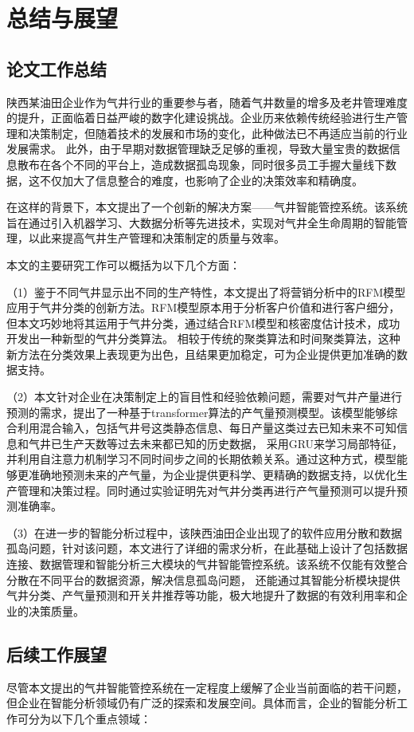 \chapter{总结与展望}
\section{论文工作总结}
陕西某油田企业作为气井行业的重要参与者，随着气井数量的增多及老井管理难度的提升，正面临着日益严峻的数字化建设挑战。企业历来依赖传统经验进行生产管理和决策制定，但随着技术的发展和市场的变化，此种做法已不再适应当前的行业发展需求。
此外，由于早期对数据管理缺乏足够的重视，导致大量宝贵的数据信息散布在各个不同的平台上，造成数据孤岛现象，同时很多员工手握大量线下数据，这不仅加大了信息整合的难度，也影响了企业的决策效率和精确度。

在这样的背景下，本文提出了一个创新的解决方案——气井智能管控系统。该系统旨在通过引入机器学习、大数据分析等先进技术，实现对气井全生命周期的智能管理，以此来提高气井生产管理和决策制定的质量与效率。

本文的主要研究工作可以概括为以下几个方面：

（1）鉴于不同气井显示出不同的生产特性，本文提出了将营销分析中的RFM模型应用于气井分类的创新方法。RFM模型原本用于分析客户价值和进行客户细分，但本文巧妙地将其运用于气井分类，通过结合RFM模型和核密度估计技术，成功开发出一种新型的气井分类算法。
相较于传统的聚类算法和时间聚类算法，这种新方法在分类效果上表现更为出色，且结果更加稳定，可为企业提供更加准确的数据支持。

（2）本文针对企业在决策制定上的盲目性和经验依赖问题，需要对气井产量进行预测的需求，提出了一种基于transformer算法的产气量预测模型。该模型能够综合利用混合输入，包括气井号这类静态信息、每日产量这类过去已知未来不可知信息和气井已生产天数等过去未来都已知的历史数据，
采用GRU来学习局部特征，并利用自注意力机制学习不同时间步之间的长期依赖关系。通过这种方式，模型能够更准确地预测未来的产气量，为企业提供更科学、更精确的数据支持，以优化生产管理和决策过程。同时通过实验证明先对气井分类再进行产气量预测可以提升预测准确率。

（3）在进一步的智能分析过程中，该陕西油田企业出现了的软件应用分散和数据孤岛问题，针对该问题，本文进行了详细的需求分析，在此基础上设计了包括数据连接、数据管理和智能分析三大模块的气井智能管控系统。该系统不仅能有效整合分散在不同平台的数据资源，解决信息孤岛问题，
还能通过其智能分析模块提供
气井分类、产气量预测和开关井推荐等功能，极大地提升了数据的有效利用率和企业的决策质量。
\section{后续工作展望}
尽管本文提出的气井智能管控系统在一定程度上缓解了企业当前面临的若干问题，但企业在智能分析领域仍有广泛的探索和发展空间。具体而言，企业的智能分析工作可分为以下几个重点领域：

